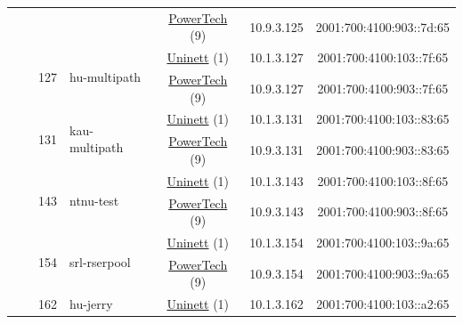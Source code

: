 \begin{small}
\begin{center}
\begin{longtable}{|c|c|c|c|c|c|c|c|}
  &  &  &  & \multicolumn{2}{|c|}{\tiny{\href{http://www.powertech.no}{PowerTech} (9)}} & \tiny{10.9.3.125} & \tiny{2001:700:4100:903::7d:65} \\* \cline{3-3}\cline{4-4}\cline{5-5}\cline{6-6}\cline{7-7}\cline{8-8}
  &  & \multirow{2}{*}{\tiny{127}} & \multicolumn{1}{|l|}{\multirow{2}{*}{\tiny{hu-multipath}}} & \multicolumn{2}{|c|}{\tiny{\href{https://www.uninett.no}{Uninett} (1)}} & \tiny{10.1.3.127} & \tiny{2001:700:4100:103::7f:65} \\* \cline{5-5}\cline{6-6}\cline{7-7}\cline{8-8}
  &  &  &  & \multicolumn{2}{|c|}{\tiny{\href{http://www.powertech.no}{PowerTech} (9)}} & \tiny{10.9.3.127} & \tiny{2001:700:4100:903::7f:65} \\* \cline{3-3}\cline{4-4}\cline{5-5}\cline{6-6}\cline{7-7}\cline{8-8}
  &  & \multirow{2}{*}{\tiny{131}} & \multicolumn{1}{|l|}{\multirow{2}{*}{\tiny{kau-multipath}}} & \multicolumn{2}{|c|}{\tiny{\href{https://www.uninett.no}{Uninett} (1)}} & \tiny{10.1.3.131} & \tiny{2001:700:4100:103::83:65} \\* \cline{5-5}\cline{6-6}\cline{7-7}\cline{8-8}
  &  &  &  & \multicolumn{2}{|c|}{\tiny{\href{http://www.powertech.no}{PowerTech} (9)}} & \tiny{10.9.3.131} & \tiny{2001:700:4100:903::83:65} \\* \cline{3-3}\cline{4-4}\cline{5-5}\cline{6-6}\cline{7-7}\cline{8-8}
  &  & \multirow{2}{*}{\tiny{143}} & \multicolumn{1}{|l|}{\multirow{2}{*}{\tiny{ntnu-test}}} & \multicolumn{2}{|c|}{\tiny{\href{https://www.uninett.no}{Uninett} (1)}} & \tiny{10.1.3.143} & \tiny{2001:700:4100:103::8f:65} \\* \cline{5-5}\cline{6-6}\cline{7-7}\cline{8-8}
  &  &  &  & \multicolumn{2}{|c|}{\tiny{\href{http://www.powertech.no}{PowerTech} (9)}} & \tiny{10.9.3.143} & \tiny{2001:700:4100:903::8f:65} \\* \cline{3-3}\cline{4-4}\cline{5-5}\cline{6-6}\cline{7-7}\cline{8-8}
  &  & \multirow{2}{*}{\tiny{154}} & \multicolumn{1}{|l|}{\multirow{2}{*}{\tiny{srl-rserpool}}} & \multicolumn{2}{|c|}{\tiny{\href{https://www.uninett.no}{Uninett} (1)}} & \tiny{10.1.3.154} & \tiny{2001:700:4100:103::9a:65} \\* \cline{5-5}\cline{6-6}\cline{7-7}\cline{8-8}
  &  &  &  & \multicolumn{2}{|c|}{\tiny{\href{http://www.powertech.no}{PowerTech} (9)}} & \tiny{10.9.3.154} & \tiny{2001:700:4100:903::9a:65} \\* \cline{3-3}\cline{4-4}\cline{5-5}\cline{6-6}\cline{7-7}\cline{8-8}
  &  & \multirow{2}{*}{\tiny{162}} & \multicolumn{1}{|l|}{\multirow{2}{*}{\tiny{hu-jerry}}} & \multicolumn{2}{|c|}{\tiny{\href{https://www.uninett.no}{Uninett} (1)}} & \tiny{10.1.3.162} & \tiny{2001:700:4100:103::a2:65} \\* \cline{5-5}\cline{6-6}\cline{7-7}\cline{8-8}

\end{longtable}
\end{center}
\end{small}
